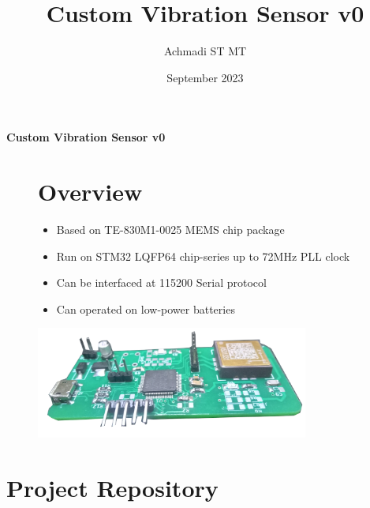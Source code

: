\documentclass[a4paper,12pt,oneside,pdflatex,italian,final,twocolumn]{article}
\title{Custom Vibration Sensor v0}
\author{Achmadi ST MT}
\date{September 2023}
\begin{document}
	\pagestyle{fancy}

	\chead{\today}

	\onecolumn
	\begin{figure}

	\end{figure}\begin{minipage}{0.47\textwidth}
		\centering

	\end{minipage}
	\hfill
	\begin{minipage}{0.47\textwidth}
		\raggedleft
		\Huge \textbf{Custom Vibration Sensor v0}
	\end{minipage}

	\begin{figure}
		\begin{minipage}{0.47\textwidth}

			\section{Overview}
			\begin{itemize}
				\item Based on TE-830M1-0025 MEMS chip package
				\item Run on STM32 LQFP64 chip-series up to 72MHz PLL clock
				\item Can be interfaced at 115200 Serial protocol
				\item Can operated on low-power batteries
			\end{itemize}

		\end{minipage}
		\hfill
		\begin{minipage}{0.47\textwidth}
			\centering
			\includegraphics[width=0.8\textwidth,right]{images/vibs.png}
		\end{minipage}
	\end{figure}

	\raggedright

	\section{Project Repository}
\end{document}
